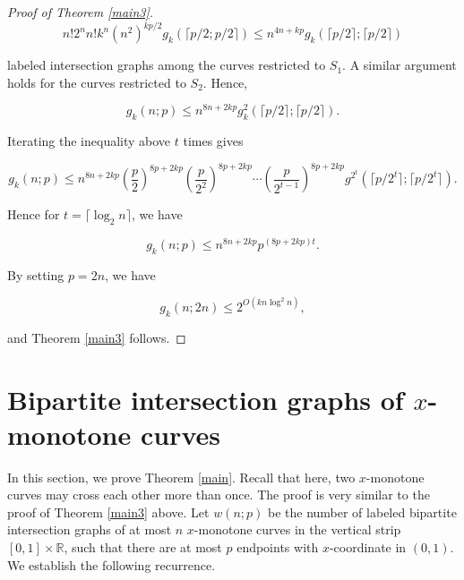 \documentclass[11pt]{article}
\theoremstyle{plain}
\theoremstyle{definition}
\theoremstyle{remark}
\begin{document}
\begin{proof}[Proof of Theorem \ref{main3}]
 $$n!2^nn!k^n(n^2)^{kp/2}g_k(\lceil p/2;p/2\rceil) \leq n^{4n + kp}g_k(\lceil p/2\rceil ;\lceil p/2\rceil)$$
 
\noindent labeled intersection graphs among the curves restricted to $S_1$.  A similar argument holds for the curves restricted to $S_2$.  Hence, 


$$g_k(n;p) \leq n^{8n + 2kp}g^2_k(\lceil p/2\rceil;\lceil p/2\rceil).$$
 
 
 \noindent Iterating the inequality above $t$ times gives
 
 
 $$g_k(n;p) \leq  n^{8n + 2kp}\left(\frac{p}{2}\right)^{8p + 2kp}\left(\frac{p}{2^2}\right)^{8p + 2kp}\cdots \left(\frac{p}{2^{t-1}}\right)^{8p + 2kp}g^{2^t}(\lceil p/2^t\rceil;\lceil p/2^t\rceil).$$
 
\noindent Hence for $t = \lceil\log_2n\rceil$, we have

$$g_k(n;p) \leq n^{8n + 2kp}p^{(8p + 2kp)t}.$$
 
\noindent By setting $p = 2n$, we have

$$g_k(n;2n) \leq 2^{O(kn\log^2n)},$$


\noindent and Theorem \ref{main3} follows. \end{proof}
  
  





  



\section{Bipartite intersection graphs of $x$-monotone curves}\label{secbip2}
 

In this section, we prove Theorem \ref{main}.  Recall that here, two $x$-monotone curves may cross each other more than once. The proof is very similar to the proof of Theorem \ref{main3} above.  Let $w(n;p)$ be the number of labeled bipartite intersection graphs of at most $n$ $x$-monotone curves in the vertical strip $[0,1]\times \mathbb{R}$, such that there are at most $p$ endpoints with $x$-coordinate in $(0,1)$.  We establish the following recurrence. 


\end{document}
